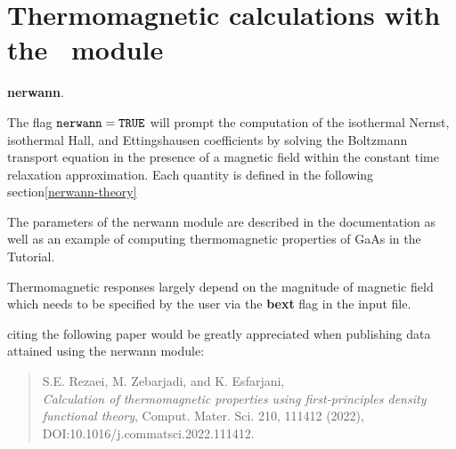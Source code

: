 \chapter{Thermomagnetic calculations with the \bw\ module} \textbf{nerwann}. 

The flag $\verb#nerwann#=\verb#TRUE#$ will prompt the computation of the isothermal Nernst, isothermal Hall, and Ettingshausen coefficients by solving the Boltzmann transport equation in the presence of a magnetic field within the constant time relaxation approximation. Each quantity is defined in the following section\ref{nerwann-theory} 

The parameters of the nerwann module are described in the documentation as well as an example of computing thermomagnetic properties of GaAs in the Tutorial. 

Thermomagnetic responses largely depend on the magnitude of magnetic field which needs to be specified by the user via the \textbf{bext} flag in the input file.


citing the following paper would be greatly appreciated when publishing data attained using the nerwann module:
\begin{quote}
S.E. Rezaei, M. Zebarjadi, and K. Esfarjani, \\
\emph{Calculation of thermomagnetic properties using first-principles density functional theory}, Comput. Mater. Sci. 210, 111412 (2022), DOI:10.1016/j.commatsci.2022.111412.
\end{quote}


